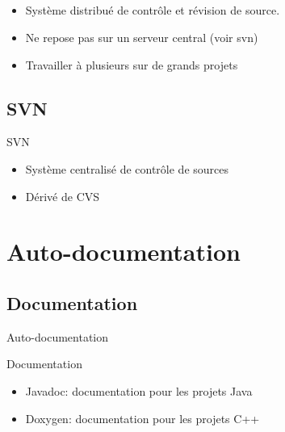\subsection{\subsectitle}
\begin{frame}{\sectitle}
    \begin{block}{\subsectitle}
        \begin{itemize}
            \item Système distribué de contrôle et révision de source.
            \item Ne repose pas sur un serveur central (voir svn)
            \item Travailler à plusieurs sur de grands projets
        \end{itemize}
    \end{block}


\def\subsectitle{SVN}
\subsection{\subsectitle}
    \begin{block}{\subsectitle}
        \begin{itemize}
            \item Système centralisé de contrôle de sources
            \item Dérivé de CVS
        \end{itemize}
    \end{block}
\end{frame}


\def\sectitle{Auto-documentation}
\section{\sectitle}
\def\subsectitle{Documentation}
\subsection{\subsectitle}
\begin{frame}{\sectitle}
    \begin{block}{\subsectitle}
        \begin{itemize}
            \item Javadoc: documentation pour les projets Java
            \item Doxygen: documentation pour les projets C++
        \end{itemize}
    \end{block}
\end{frame}


